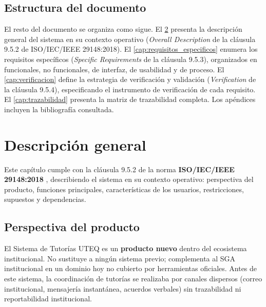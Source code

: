 \documentclass[11pt,a4paper,twoside]{report}
\begin{document}
\section{Estructura del documento}
\label{sec:estructura}

El resto del documento se organiza como sigue. El \cref{cap:descripcion} presenta la descripci\'on general del sistema en su contexto operativo (\emph{Overall Description} de la cl\'ausula 9.5.2 de ISO/IEC/IEEE 29148:2018). El \cref{cap:requisitos_especificos} enumera los requisitos espec\'ificos (\emph{Specific Requirements} de la cl\'ausula 9.5.3), organizados en funcionales, no funcionales, de interfaz, de usabilidad y de proceso. El \cref{cap:verificacion} define la estrategia de verificaci\'on y validaci\'on (\emph{Verification} de la cl\'ausula 9.5.4), especificando el instrumento de verificaci\'on de cada requisito. El \cref{cap:trazabilidad} presenta la matriz de trazabilidad completa. Los ap\'endices incluyen la bibliograf\'ia consultada.

\chapter{Descripci\'on general}
\label{cap:descripcion}

\begin{cajaNota}[title=Prop\'osito de este cap\'itulo]
    Este cap\'itulo cumple con la cl\'ausula 9.5.2 de la norma \textbf{ISO/IEC/IEEE 29148:2018} \cite{iso29148}, describiendo el sistema en su contexto operativo: perspectiva del producto, funciones principales, caracter\'isticas de los usuarios, restricciones, supuestos y dependencias.
\end{cajaNota}

\section{Perspectiva del producto}
\label{sec:perspectiva}

El Sistema de Tutor\'ias UTEQ es un \textbf{producto nuevo} dentro del ecosistema institucional. No sustituye a ning\'un sistema previo; complementa al SGA institucional en un dominio hoy no cubierto por herramientas oficiales. Antes de este sistema, la coordinaci\'on de tutor\'ias se realizaba por canales dispersos (correo institucional, mensajer\'ia instant\'anea, acuerdos verbales) sin trazabilidad ni reportabilidad institucional.
\end{document}
